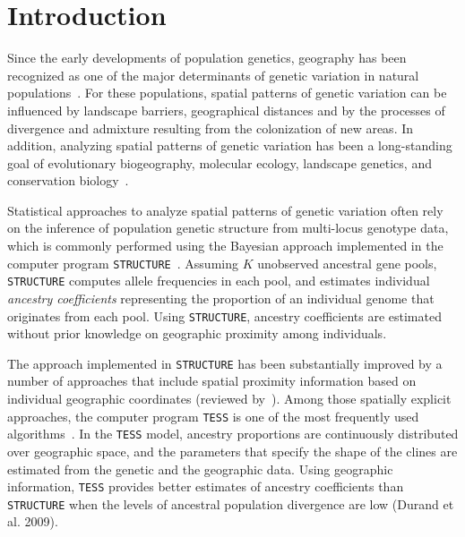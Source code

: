 
     
  \section{Introduction}


Since the early developments of population genetics, geography has been recognized as one of the major determinants of genetic variation in natural populations~\citep{wright1943isolation,malecot1948mathematics,kimura1964stepping,cavalli1994history,
epperson2003geographical}. For these populations, spatial patterns of genetic variation can be influenced by landscape barriers, geographical distances and by the processes of divergence and admixture resulting from the colonization of new areas. In addition, analyzing spatial patterns of genetic variation has been a long-standing goal of evolutionary biogeography, molecular ecology, landscape genetics, and conservation biology~\citep{segelbacher2010applications,manel2010perspectives}.


Statistical approaches to analyze spatial patterns of genetic variation often rely on the inference of population genetic structure from multi-locus genotype data, which is commonly performed using the Bayesian approach implemented in the computer program {\tt STRUCTURE}~\citep{pritchard2000inference}.  Assuming $K$ unobserved ancestral gene pools, {\tt STRUCTURE} computes allele frequencies in each pool, and estimates individual {\it ancestry coefficients} representing the proportion of an individual genome that originates from each pool. Using {\tt STRUCTURE}, ancestry coefficients are estimated without prior knowledge on geographic proximity among individuals. 

The approach implemented in {\tt STRUCTURE} has been substantially improved by a number of approaches that include spatial proximity information based on individual geographic coordinates (reviewed by~\cite{franccois2010spatially}). Among those spatially explicit approaches, the computer program {\tt TESS} is one of the most frequently used algorithms~\citep{chen2007bayesian,franccois2006bayesian}. In the {\tt TESS} model, ancestry proportions are continuously distributed over geographic space, and the parameters that specify the shape of the clines are estimated from the genetic and the geographic data. Using geographic information, {\tt TESS} provides better estimates of ancestry coefficients than {\tt STRUCTURE} when the levels of ancestral population divergence are low (Durand et al. 2009).  

